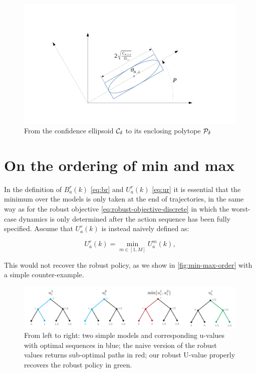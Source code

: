 \documentclass{article}
\begin{document}
\begin{figure}
	\centering
	\includegraphics[trim={3.8cm, 2cm, 5cm, 3.8cm}, clip, width=0.7\linewidth]{img/ellipsoid_to_polytope}
	\caption{From the confidence ellipsoid $\mathcal{C}_\delta$ to its enclosing polytope $\mathcal{P}_\delta$}
	\label{fig:ellipsoid_to_polytope}
\end{figure}

\section{On the ordering of min and max}
	\label{sec:min-max-order}

	In the definition of $B_{a}^{r}(k)$ \eqref{eq:br} and $U_{a}^{r}(k)$ \eqref{eq:ur} it is essential that the minimum over the models is only taken at the end of trajectories, in the same way as for the robust objective \eqref{eq:robust-objective-discrete} in which the worst-case dynamics is only determined after the action sequence has been fully specified. Assume that $U_{a}^{r}(k)$ is instead naively defined as:
	
	\[
	U_{a}^{r}(k)=\min_{m\in[1,M]}U_{a}^{m}(k),
	\]
	
	This would not recover the robust policy, as we show in \autoref{fig:min-max-order} with a simple counter-example.
	\begin{figure}[htp]
		\centering
		\includegraphics[width=\linewidth]{img/min-max-order}
		\caption{From left to right: two simple models and corresponding u-values with optimal sequences in blue; the naive version of the robust values returns sub-optimal paths in red; our robust U-value properly recovers the robust policy in green.}
		\label{fig:min-max-order}
	\end{figure}
\end{document}

